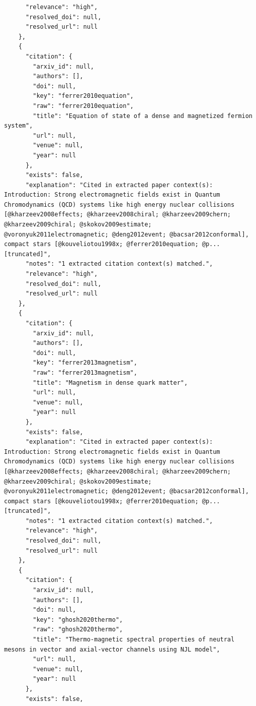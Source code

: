 \documentclass[11pt]{article}
\begin{document}
\begin{verbatim}
      "relevance": "high",
      "resolved_doi": null,
      "resolved_url": null
    },
    {
      "citation": {
        "arxiv_id": null,
        "authors": [],
        "doi": null,
        "key": "ferrer2010equation",
        "raw": "ferrer2010equation",
        "title": "Equation of state of a dense and magnetized fermion system",
        "url": null,
        "venue": null,
        "year": null
      },
      "exists": false,
      "explanation": "Cited in extracted paper context(s): Introduction: Strong electromagnetic fields exist in Quantum Chromodynamics (QCD) systems like high energy nuclear collisions [@kharzeev2008effects; @kharzeev2008chiral; @kharzeev2009chern; @kharzeev2009chiral; @skokov2009estimate; @voronyuk2011electromagnetic; @deng2012event; @bacsar2012conformal], compact stars [@kouveliotou1998x; @ferrer2010equation; @p... [truncated]",
      "notes": "1 extracted citation context(s) matched.",
      "relevance": "high",
      "resolved_doi": null,
      "resolved_url": null
    },
    {
      "citation": {
        "arxiv_id": null,
        "authors": [],
        "doi": null,
        "key": "ferrer2013magnetism",
        "raw": "ferrer2013magnetism",
        "title": "Magnetism in dense quark matter",
        "url": null,
        "venue": null,
        "year": null
      },
      "exists": false,
      "explanation": "Cited in extracted paper context(s): Introduction: Strong electromagnetic fields exist in Quantum Chromodynamics (QCD) systems like high energy nuclear collisions [@kharzeev2008effects; @kharzeev2008chiral; @kharzeev2009chern; @kharzeev2009chiral; @skokov2009estimate; @voronyuk2011electromagnetic; @deng2012event; @bacsar2012conformal], compact stars [@kouveliotou1998x; @ferrer2010equation; @p... [truncated]",
      "notes": "1 extracted citation context(s) matched.",
      "relevance": "high",
      "resolved_doi": null,
      "resolved_url": null
    },
    {
      "citation": {
        "arxiv_id": null,
        "authors": [],
        "doi": null,
        "key": "ghosh2020thermo",
        "raw": "ghosh2020thermo",
        "title": "Thermo-magnetic spectral properties of neutral mesons in vector and axial-vector channels using NJL model",
        "url": null,
        "venue": null,
        "year": null
      },
      "exists": false,

\end{verbatim}
\end{document}
